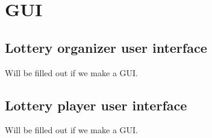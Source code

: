 \section{GUI}
\label{sec:gui}

\subsection{Lottery organizer user interface}
Will be filled out if we make a GUI.

\subsection{Lottery player user interface}
Will be filled out if we make a GUI.
